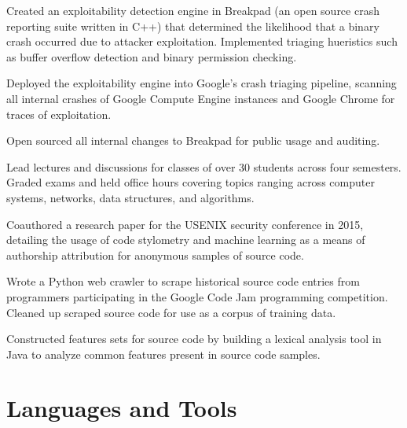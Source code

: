 \documentclass[]{template}
\begin{document}
\begin{tightemize}
\item
  Created an exploitability detection engine in Breakpad (an open source crash
  reporting suite written in C++) that determined the likelihood that a binary
  crash occurred due to attacker exploitation. Implemented triaging hueristics
  such as buffer overflow detection and binary permission checking.
\item
  Deployed the exploitability engine into Google's crash triaging pipeline,
  scanning all internal crashes of Google Compute Engine instances and Google
  Chrome for traces of exploitation.
\item
  Open sourced all internal changes to Breakpad for public usage and auditing.
\end{tightemize}
\sectionsep

\begin{tightemize}
\item
  Lead lectures and discussions for classes of over 30 students across four
  semesters. Graded exams and held office hours covering topics ranging across
  computer systems, networks, data structures, and algorithms.
\end{tightemize}
\sectionsep

\begin{tightemize}
\item
  Coauthored a research paper for the USENIX security conference in 2015,
  detailing the usage of code stylometry and machine learning as a means of
  authorship attribution for anonymous samples of source code.
\item
  Wrote a Python web crawler to scrape historical source code entries from
  programmers participating in the Google Code Jam programming competition.
  Cleaned up scraped source code for use as a corpus of training data.
\item
  Constructed features sets for source code by building a lexical analysis tool
  in Java to analyze common features present in source code samples.
\end{tightemize}
\sectionsep

\section{Languages and Tools}
\end{document}

